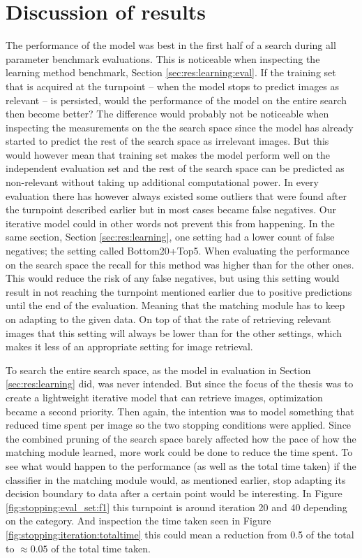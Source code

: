 
\section{Discussion of results}
\label{sec:concl:meas}
The performance of the model was best in the first half of a search during all parameter benchmark evaluations. This is noticeable when inspecting the learning method benchmark, Section \ref{sec:res:learning:eval}. If the training set that is acquired at the turnpoint -- when the model stops to predict images as relevant -- is persisted, would the performance of the model on the entire search then become better? The difference would probably not be noticeable when inspecting the measurements on the the search space since the model has already started to predict the rest of the search space as irrelevant images. But this would however mean that training set makes the model perform well on the independent evaluation set and the rest of the search space can be predicted as non-relevant without taking up additional computational power. In every evaluation there has however always existed some outliers that were found after the turnpoint described earlier but in most cases became false negatives. Our iterative model could in other words not prevent this from happening. 
In the same section, Section \ref{sec:res:learning}, one setting had a lower count of false negatives; the setting called Bottom20+Top5. When evaluating the performance on the search space the recall for this method was higher than for the other ones. This would reduce the risk of any false negatives, but using this setting would result in not reaching the turnpoint mentioned earlier due to positive predictions until the end of the evaluation. Meaning that the matching module has to keep on adapting to the given data. On top of that the rate of retrieving relevant images that this setting will always be lower than for the other settings, which makes it less of an appropriate setting for image retrieval. 

To search the entire search space, as the model in evaluation in Section \ref{sec:res:learning} did, was never intended. But since the focus of the thesis was to create a lightweight iterative model that can retrieve images, optimization became a second priority. Then again, the intention was to model something that reduced time spent per image so the two stopping 
conditions were applied. Since the combined pruning of the search space barely affected how the pace of how the matching module learned, more work could be done to reduce the time spent. To see what would happen to the performance (as well as the total time taken) if the classifier in the matching module would, as mentioned earlier, stop adapting its decision boundary to data after a certain point would be interesting. In Figure \ref{fig:stopping:eval_set:f1} this turnpoint is around iteration 20 and 40 depending on the category. And inspection the time taken seen in Figure \ref{fig:stopping:iteration:totaltime} this could mean a reduction from 0.5 of the total to $\approx0.05$ of the total time taken.  

